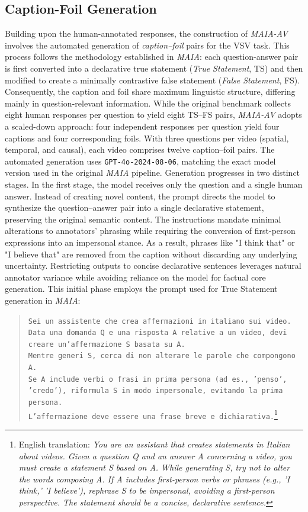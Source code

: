 \subsection*{Caption-Foil Generation}
Building upon the human-annotated responses, the construction of \textit{MAIA-AV} involves the automated generation of \textit{caption--foil} pairs for the \ac{VSV} task. This process follows the methodology established in \textit{MAIA}: each question-answer pair is first converted into a declarative true statement (\textit{True Statement}, TS) and then modified to create a minimally contrastive false statement (\textit{False Statement}, FS). Consequently, the caption and foil share maximum linguistic structure, differing mainly in question-relevant information. 
While the original benchmark collects eight human responses per question to yield eight TS--FS pairs, \textit{MAIA-AV} adopts a scaled-down approach: four independent responses per question yield four captions and four corresponding foils. With three questions per video (spatial, temporal, and causal), each video comprises twelve caption--foil pairs. The automated generation uses \texttt{GPT-4o-2024-08-06}, matching the exact model version used in the original \textit{MAIA} pipeline. Generation progresses in two distinct stages. In the first stage, the model receives only the question and a single human answer. 
Instead of creating novel content, the prompt directs the model to synthesize the question--answer pair into a single declarative statement, preserving the original semantic content.
The instructions mandate minimal alterations to annotators' phrasing while requiring the conversion of first-person expressions into an impersonal stance. As a result, phrases like "I think that" or "I believe that" are removed from the caption without discarding any underlying uncertainty. Restricting outputs to concise declarative sentences leverages natural annotator variance while avoiding reliance on the model for factual core generation.
This initial phase employs the prompt used for True Statement generation in \textit{MAIA}:
\begin{quote}
\small
\texttt{Sei un assistente che crea affermazioni in italiano sui video.}\\
\texttt{Data una domanda Q e una risposta A relative a un video, devi creare un'affermazione S basata su A.}\\
\texttt{Mentre generi S, cerca di non alterare le parole che compongono A.}\\
\texttt{Se A include verbi o frasi in prima persona (ad es., 'penso', 'credo'), riformula S in modo impersonale, evitando la prima persona.}\\
\texttt{L'affermazione deve essere una frase breve e dichiarativa.}\footnote{English translation: \textit{You are an assistant that creates statements in Italian about videos. Given a question Q and an answer A concerning a video, you must create a statement S based on A. While generating S, try not to alter the words composing A. If A includes first-person verbs or phrases (e.g., 'I think,' 'I believe'), rephrase S to be impersonal, avoiding a first-person perspective. The statement should be a concise, declarative sentence.}}
\end{quote}
